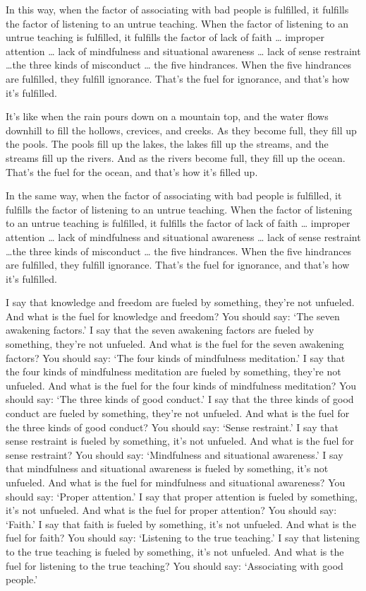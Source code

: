 \documentclass[12pt,openany]{book}%
\begin{document}
In this way, when the factor of associating with bad people is fulfilled, it fulfills the factor of listening to an untrue teaching. When the factor of listening to an untrue teaching is fulfilled, it fulfills the factor of lack of faith … improper attention … lack of mindfulness and situational awareness … lack of sense restraint …the three kinds of misconduct … the five hindrances. When the five hindrances are fulfilled, they fulfill ignorance. That’s the fuel for ignorance, and that’s how it’s fulfilled. 

It’s like when the rain pours down on a mountain top, and the water flows downhill to fill the hollows, crevices, and creeks. As they become full, they fill up the pools. The pools fill up the lakes, the lakes fill up the streams, and the streams fill up the rivers. And as the rivers become full, they fill up the ocean. That’s the fuel for the ocean, and that’s how it’s filled up. 

In the same way, when the factor of associating with bad people is fulfilled, it fulfills the factor of listening to an untrue teaching. When the factor of listening to an untrue teaching is fulfilled, it fulfills the factor of lack of faith … improper attention … lack of mindfulness and situational awareness … lack of sense restraint …the three kinds of misconduct … the five hindrances. When the five hindrances are fulfilled, they fulfill ignorance. That’s the fuel for ignorance, and that’s how it’s fulfilled. 

I say that knowledge and freedom are fueled by something, they’re not unfueled. And what is the fuel for knowledge and freedom? You should say: ‘The seven awakening factors.’ I say that the seven awakening factors are fueled by something, they’re not unfueled. And what is the fuel for the seven awakening factors? You should say: ‘The four kinds of mindfulness meditation.’ I say that the four kinds of mindfulness meditation are fueled by something, they’re not unfueled. And what is the fuel for the four kinds of mindfulness meditation? You should say: ‘The three kinds of good conduct.’ I say that the three kinds of good conduct are fueled by something, they’re not unfueled. And what is the fuel for the three kinds of good conduct? You should say: ‘Sense restraint.’ I say that sense restraint is fueled by something, it’s not unfueled. And what is the fuel for sense restraint? You should say: ‘Mindfulness and situational awareness.’ I say that mindfulness and situational awareness is fueled by something, it’s not unfueled. And what is the fuel for mindfulness and situational awareness? You should say: ‘Proper attention.’ I say that proper attention is fueled by something, it’s not unfueled. And what is the fuel for proper attention? You should say: ‘Faith.’ I say that faith is fueled by something, it’s not unfueled. And what is the fuel for faith? You should say: ‘Listening to the true teaching.’ I say that listening to the true teaching is fueled by something, it’s not unfueled. And what is the fuel for listening to the true teaching? You should say: ‘Associating with good people.’ 
\end{document}
